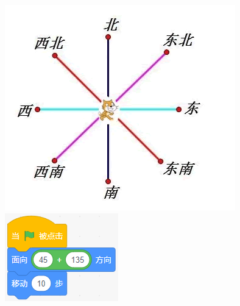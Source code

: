 \documentclass[10pt, a4paper]{article}
\begin{document}
\begin{enumerate}
        \begin{figure}[htbp]
            \centering
            \begin{minipage}[t]{.26\textwidth}
                \centering
                \begin{minipage}[t]{.45\textwidth}
                    \centering
                    \includegraphics[width=\textwidth]{figure/23-1.png}
                \end{minipage}
                \begin{minipage}[t]{.5\textwidth}
                    \centering
                    \includegraphics[width=\textwidth]{figure/23-2.png}

\end{minipage}
\end{minipage}
\end{figure}
\end{enumerate}
\end{document}

